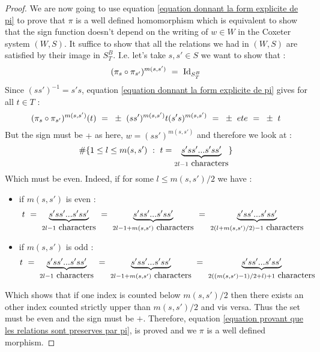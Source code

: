 \begin{proof}
		We are now going to use equation \ref{equation donnant la form explicite de pi} to prove that $\pi$ is a well defined homomorphism which is equivalent to show that the sign function doesn't depend on the writing of $w\in W$ in the Coxeter system $(W,S)$. It suffice to show that all the relations we had in $(W,S)$ are satisfied by their image in $S^B_T$. I.e. let's take $s,s'\in S$ we want to show that :
		\begin{equation}\label{equation provant que les relations sont preserves par pi}
		(\pi_s\circ \pi_{s'})^{m(s,s')}\text{ }=\text{ } \mbox{Id}_{S^B_T}
		\end{equation}
		Since $(ss')^{-1}=s's$, equation \ref{equation donnant la form explicite de pi} gives for all $t\in T$ :
		\begin{equation}
		(\pi_s\circ \pi_{s'})^{m(s,s')}(t)\text{ }=\text{ } \pm\text{ } (ss')^{m(s,s')}t(s's)^{m(s,s')}\text{ }=\text{ } \pm \text{ } et e\text{ }=\text{ }\pm \text{ }  t
		\end{equation}
		But the sign must be $+$ as here, $w=(ss')^{m(s,s')}$ and therefore we look at :
		\begin{equation}
		{\# \{1\leq l\leq m(s,s') \text{ }:\text{ }t=\underset{2l-1 \mbox{ characters}}{\underbrace{s'ss'...s'ss'}}\}}
		\end{equation}
		Which must be even. Indeed, if for some $l\leq m(s,s')/2$ we have :
		\begin{itemize}
			\item if $ m(s,s')$ is even : 
			\begin{equation}
			t\text{ }=\text{ } \underset{2l-1 \mbox{ characters}}{\underbrace{s'ss'...s'ss'}}\text{ }=\text{ }\underset{2l-1 + m(s,s') \mbox{ characters}}{\underbrace{s'ss'...s'ss'}}\text{ }=\text{ } \underset{2(l+m(s,s')/2)-1 \mbox{ characters}}{\underbrace{s'ss'...s'ss'}} 
			\end{equation}
			\item  if $ m(s,s')$ is odd :
			\begin{equation}
			t\text{ }=\text{ } \underset{2l-1 \mbox{ characters}}{\underbrace{s'ss'...s'ss'}}\text{ }=\text{ }\underset{2l-1 +m(s,s') \mbox{ characters}}{\underbrace{s'ss'...s'ss'}}\text{ }=\text{ } \underset{2((m(s,s')-1)/2+l)+1 \mbox{ characters}}{\underbrace{s'ss'...s'ss'}} 
			\end{equation} 
		\end{itemize}
	Which shows that if one index is counted below $m(s,s')/2$ then there exists an other index counted strictly upper than $m(s,s')/2$ and vis versa. Thus the set must be even and the sign must be $+$. Therefore, equation \eqref{equation provant que les relations sont preserves par pi}, is proved and we $\pi$ is a well defined morphism.
	

\end{proof}
